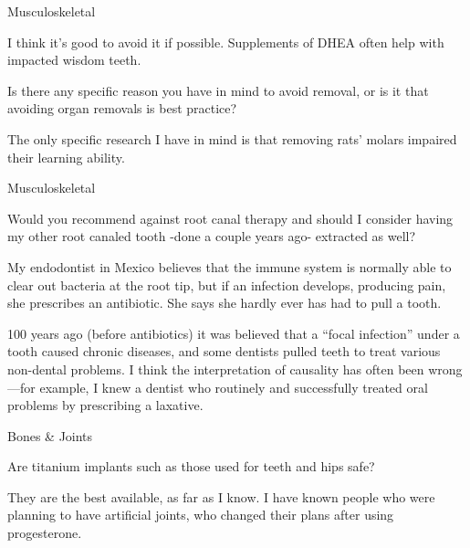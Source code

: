 \documentclass[11pt,oneside,openany,extrafontsizes]{memoir}
\begin{document}
\begin{emailexchange}{Musculoskeletal}

    \begin{answer}
        I think it's good to avoid it if possible. Supplements of DHEA often help with impacted wisdom teeth.
    \end{answer}

    \begin{question}
        Is there any specific reason you have in mind to avoid removal, or is it that avoiding organ removals is best practice?
    \end{question}

    \begin{answer}
        The only specific research I have in mind is that removing rats' molars impaired their learning ability.
    \end{answer}
\end{emailexchange}

\begin{qaexchange}{Musculoskeletal}

    \begin{question}
        Would you recommend against root canal therapy and should I consider having my other root canaled tooth -done a couple years ago- extracted as well?
    \end{question}

    \begin{answer}
        My endodontist in Mexico believes that the immune system is normally able to clear out bacteria at the root tip, but if an infection develops, producing pain, she prescribes an antibiotic. She says she hardly ever has had to pull a tooth.

100 years ago (before antibiotics) it was believed that a \enquote{focal infection} under a tooth caused chronic diseases, and some dentists pulled teeth to treat various non-dental problems. I think the interpretation of causality has often been wrong—for example, I knew a dentist who routinely and successfully treated oral problems by prescribing a laxative.
    \end{answer}
\end{qaexchange}

\begin{qaexchange}{Bones \& Joints}

    \begin{question}
        Are titanium implants such as those used for teeth and hips safe?
    \end{question}

    \begin{answer}
      They are the best available, as far as I know. I have known people who were planning to have artificial joints, who changed their plans after using progesterone.
    \end{answer}
\end{qaexchange}
\end{document}
